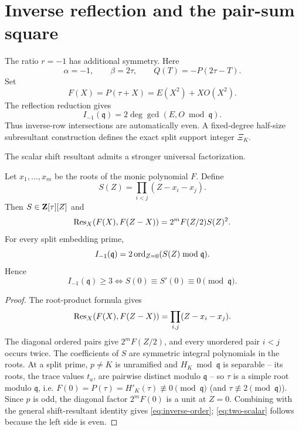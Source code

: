\section{Inverse reflection and the pair-sum square}

The ratio $r=-1$ has additional symmetry.  Here
\[
\alpha=-1,\qquad \beta=2\tau,
\qquad Q(T)=-P(2\tau-T).
\]
Set
\begin{equation}\label{eq:FEO}
F(X)=P(\tau+X)=E(X^2)+XO(X^2).
\end{equation}
The reflection reduction gives
\begin{equation}\label{eq:inverse-gcd}
I_{-1}(\mathfrak q)=2\deg\gcd(E,O\bmod\mathfrak q).
\end{equation}
Thus inverse-row intersections are automatically even.  A fixed-degree
half-size subresultant construction defines the exact split support integer
$\Xi_K$.

The scalar shift resultant admits a stronger universal factorization.

\begin{theorem}\label{thm:pairsum}
Let $x_1,\ldots,x_m$ be the roots of the monic polynomial $F$.  Define
\[
S(Z)=\prod_{i<j}(Z-x_i-x_j).
\]
Then $S\in\mathbf Z[\tau][Z]$ and
\begin{equation}\label{eq:pairsquare}
\operatorname{Res}_X(F(X),F(Z-X))=2^mF(Z/2)S(Z)^2.
\end{equation}
For every split embedding prime,
\begin{equation}\label{eq:inverse-order}
I_{-1}(\mathfrak q)=2\operatorname{ord}_{Z=0}(S(Z)\bmod\mathfrak q).
\end{equation}
Hence
\begin{equation}\label{eq:two-scalar}
I_{-1}(\mathfrak q)\ge3
\iff
S(0)\equiv S'(0)\equiv0\pmod{\mathfrak q}.
\end{equation}
\end{theorem}

\begin{proof}
The root-product formula gives
\[
\operatorname{Res}_X(F(X),F(Z-X))=\prod_{i,j}(Z-x_i-x_j).
\]
The diagonal ordered pairs give $2^mF(Z/2)$, and every unordered pair $i<j$
occurs twice.  The coefficients of $S$ are symmetric integral polynomials in
the roots.  At a split prime, $p\ne K$ is unramified and
$H_K\bmod\mathfrak q$ is separable -- its roots, the trace values $t_a$,
are pairwise distinct modulo $\mathfrak q$ -- so $\tau$ is a simple root
modulo $\mathfrak q$, i.e. $F(0)=P(\tau)=H'_K(\tau)\not\equiv0
\pmod{\mathfrak q}$ (and $\tau\not\equiv2\pmod{\mathfrak q}$).  Since $p$
is odd, the diagonal factor $2^mF(0)$ is a unit at $Z=0$.  Combining with the
general shift-resultant identity gives \eqref{eq:inverse-order};
\eqref{eq:two-scalar} follows because the left side is even.
\end{proof}

